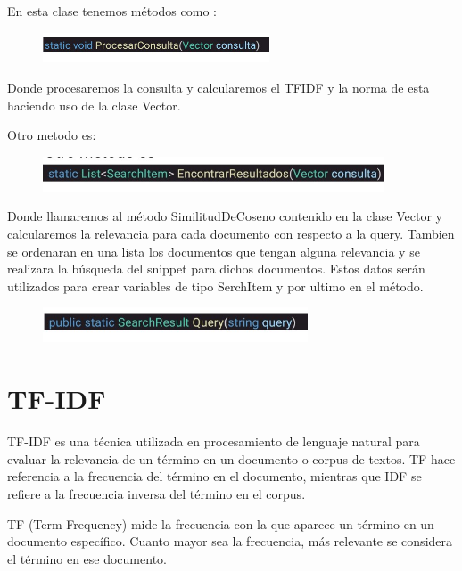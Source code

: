 \documentclass[a4paper,12pt]{article}
\begin{document}
En esta clase tenemos métodos como :

\begin{figure}[H]
    \centering
    \includegraphics[width=0.6\textwidth]{imagenes/6.jpg}
\end{figure}

Donde procesaremos la consulta y calcularemos el TFIDF y la norma de esta haciendo uso de la clase Vector.

Otro metodo es:

\begin{figure}[H]
    \centering
    \includegraphics[width=0.9\textwidth]{imagenes/7.jpg}
\end{figure}

Donde llamaremos al método SimilitudDeCoseno contenido en la clase Vector y calcularemos la relevancia para cada documento con respecto a la query.
Tambien se ordenaran en una lista los documentos que tengan alguna relevancia y se realizara la búsqueda del snippet para dichos documentos.
Estos datos serán utilizados para crear variables de tipo SerchItem y por ultimo en el método.

\begin{figure}[H]
    \centering
    \includegraphics[width=0.7\textwidth]{imagenes/8.jpg}
\end{figure}

\section{TF-IDF}\label{sec:TF-IDF}

TF-IDF es una técnica utilizada en procesamiento de lenguaje natural para evaluar la relevancia de un término en un documento o corpus de textos. TF hace referencia a la frecuencia del 
término en el documento, mientras que IDF se refiere a la frecuencia inversa del término en el corpus.

TF (Term Frequency) mide la frecuencia con la que aparece un término en un documento específico. Cuanto mayor sea la frecuencia, más relevante se considera el término en ese documento.
\end{document}
